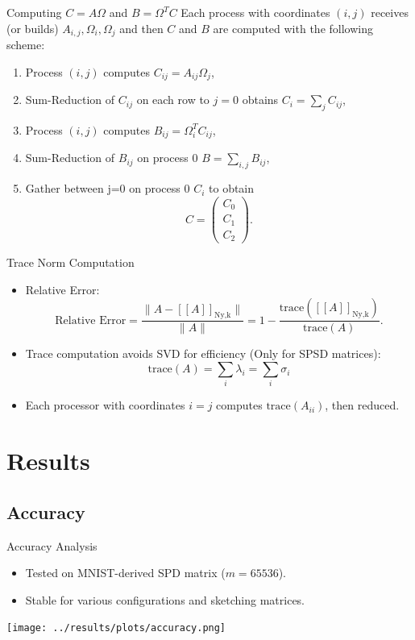 \documentclass[aspectratio=169, xcolor=table]{beamer}
\begin{document}
  \begin{frame}{Computing $C = A\Omega$ and $B =\Omega^TC$}
    Each process with coordinates $(i,j)$ receives (or builds) $A_{i,j},\Omega_i,\Omega_j$ and then $C$ and $B$ are computed with the following scheme:
    \begin{center}      
      \begin{enumerate}
        \item Process $(i,j)$  computes  $C_{ij}=A_{ij}\Omega_j$,
        \item Sum-Reduction of  $C_{ij}$ on each row to $j=0$ obtains  $C_i = \sum_j C_{ij}$,
        \item Process $(i,j)$ computes  $B_{ij}=\Omega_i^T C_{ij}$,
        \item Sum-Reduction of $ B_{ij}$ on process 0  $B = \sum_{i,j} B_{ij}$,
        \item Gather between j=0 on process 0  $C_{i}$ to obtain  \[C = \begin{pmatrix}
        C_{0} \\
        C_{1} \\
        C_{2}
        \end{pmatrix}.
        \]
      \end{enumerate}
    \end{center}
\end{frame}  
\begin{frame}{Trace Norm Computation}
  \begin{itemize}
    \item Relative Error:
      \[
      \text{Relative Error} = \frac{\| A - [\![A]\!]_{\text{Ny,k}} \|}{\|A\|} = 1 - \frac{\text{trace}([\![A]\!]_{\text{Ny,k}})}{\text{trace}(A)}.
      \]
    \item Trace computation avoids SVD for efficiency (Only for SPSD matrices):
      \[
      \text{trace}(A) = \sum_i \lambda_i = \sum_{i}\sigma_i
      \]
    \item Each processor with coordinates $i=j$ computes $\text{trace}(A_{ii})$, then reduced.  
  \end{itemize}
\end{frame}

\section{Results}
\subsection{Accuracy}
\begin{frame}{Accuracy Analysis}
  \begin{itemize}
    \item Tested on MNIST-derived SPD matrix ($m=65536$).
    \item Stable for various configurations and sketching matrices.
  \end{itemize}
  \texttt{[image: ../results/plots/accuracy.png]}
\end{frame}
\end{document}

